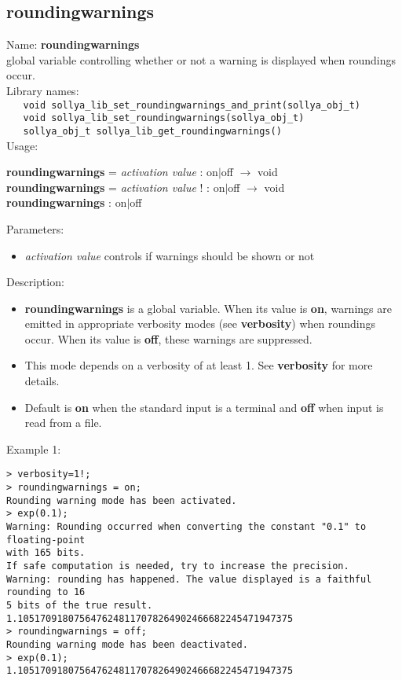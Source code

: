 \subsection{roundingwarnings}
\label{labroundingwarnings}
\noindent Name: \textbf{roundingwarnings}\\
\phantom{aaa}global variable controlling whether or not a warning is displayed when roundings occur.\\[0.2cm]
\noindent Library names:\\
\verb|   void sollya_lib_set_roundingwarnings_and_print(sollya_obj_t)|\\
\verb|   void sollya_lib_set_roundingwarnings(sollya_obj_t)|\\
\verb|   sollya_obj_t sollya_lib_get_roundingwarnings()|\\[0.2cm]
\noindent Usage: 
\begin{center}
\textbf{roundingwarnings} = \emph{activation value} : \textsf{on$|$off} $\rightarrow$ \textsf{void}\\
\textbf{roundingwarnings} = \emph{activation value} ! : \textsf{on$|$off} $\rightarrow$ \textsf{void}\\
\textbf{roundingwarnings} : \textsf{on$|$off}\\
\end{center}
Parameters: 
\begin{itemize}
\item \emph{activation value} controls if warnings should be shown or not
\end{itemize}
\noindent Description: \begin{itemize}

\item \textbf{roundingwarnings} is a global variable. When its value is \textbf{on}, warnings are
   emitted in appropriate verbosity modes (see \textbf{verbosity}) when roundings
   occur.  When its value is \textbf{off}, these warnings are suppressed.

\item This mode depends on a verbosity of at least 1. See
   \textbf{verbosity} for more details.

\item Default is \textbf{on} when the standard input is a terminal and
   \textbf{off} when \sollya input is read from a file.
\end{itemize}
\noindent Example 1: 
\begin{center}\begin{minipage}{15cm}\begin{Verbatim}[frame=single]
> verbosity=1!;
> roundingwarnings = on;
Rounding warning mode has been activated.
> exp(0.1);
Warning: Rounding occurred when converting the constant "0.1" to floating-point 
with 165 bits.
If safe computation is needed, try to increase the precision.
Warning: rounding has happened. The value displayed is a faithful rounding to 16
5 bits of the true result.
1.1051709180756476248117078264902466682245471947375
> roundingwarnings = off;
Rounding warning mode has been deactivated.
> exp(0.1);
1.1051709180756476248117078264902466682245471947375
\end{Verbatim}
\end{minipage}\end{center}
